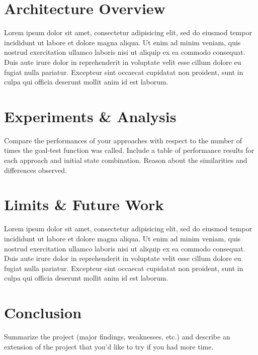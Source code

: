 \documentclass[a4paper,12pt]{article}
\begin{document}
\section{Architecture Overview}
Lorem ipsum dolor sit amet, consectetur adipisicing elit, sed do eiusmod tempor incididunt ut labore et dolore magna aliqua. Ut enim ad minim veniam, quis nostrud exercitation ullamco laboris nisi ut aliquip ex ea commodo consequat. Duis aute irure dolor in reprehenderit in voluptate velit esse cillum dolore eu fugiat nulla pariatur. Excepteur sint occaecat cupidatat non proident, sunt in culpa qui officia deserunt mollit anim id est laborum.

\section{Experiments \& Analysis}
Compare the performances of your approaches with respect to the
number of times the goal-test function was called. Include a table of performance results for each
approach and initial state combination. Reason about the similarities and differences observed.

\section{Limits \& Future Work}
Lorem ipsum dolor sit amet, consectetur adipisicing elit, sed do eiusmod tempor incididunt ut labore et dolore magna aliqua. Ut enim ad minim veniam, quis nostrud exercitation ullamco laboris nisi ut aliquip ex ea commodo consequat. Duis aute irure dolor in reprehenderit in voluptate velit esse cillum dolore eu fugiat nulla pariatur. Excepteur sint occaecat cupidatat non proident, sunt in culpa qui officia deserunt mollit anim id est laborum.


\section{Conclusion}
Summarize the project (major findings, weaknesses, etc.) and describe an extension
of the project that you’d like to try if you had more time.

%
%
\end{document}
